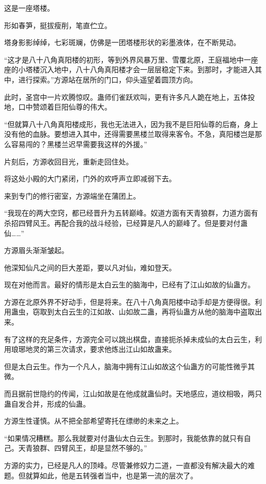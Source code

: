 
\begin{this_body}

这是一座塔楼。

形如春笋，挺拔瘦削，笔直伫立。

塔身影影绰绰，七彩斑斓，仿佛是一团塔楼形状的彩墨液体，在不断晃动。

“这才是八十八角真阳楼的初形，等到外界风暴万里、雪覆北原，王庭福地中一座座的小塔楼沉入地中，八十八角真阳楼才会一层层稳定下来。到那时，才能进入其中，进行探索。”方源站在居所的门口，仰头遥望着圆顶方向。

此时，圣宫中一片欢腾惊叹。蛊师们雀跃欢叫，更有许多凡人跪在地上，五体投地，口中赞颂着巨阳仙尊的伟大。

“但就算八十八角真阳楼成形，我也无法进入，因为我不是巨阳仙尊的后裔，身上没有他的血脉。要想进入其中，还得需要黑楼兰取得来客令。不急，真阳楼岂是那么容易闯的？黑楼兰迟早需要我这样的外援。”

片刻后，方源收回目光，重新走回住处。

将这处小殿的大门紧闭，门外的欢呼声立即减弱下去。

来到专门的修行密室，方源端坐在蒲团上。

“我现在的两大空窍，都已经晋升为五转巅峰。奴道方面有天青狼群，力道方面有杀招四臂风王。再配合我的战斗经验，已经算是凡人的巅峰了。但是要对付蛊仙……”

方源眉头渐渐皱起。

他深知仙凡之间的巨大差距，要以凡对仙，难如登天。

现在对他而言。最好的情形是太白云生的脑海中，已经有了江山如故的仙蛊方。

方源在北原外界不好动手，但是将来。在八十八角真阳楼中动手却是方便得很。利用蛊虫，窃取到太白云生的江如故、山如故二蛊，再将仙蛊方从他的脑海中盗取出来。

有了这样的充足条件，方源完全可以跳出棋盘，直接扼杀掉未成仙的太白云生，利用琅琊地灵的第三次请求，要求他炼出江山如故蛊来。

但是太白云生。作为一个凡人，脑海中拥有江山如故这个仙蛊方的可能性微乎其微。

而且据前世隐约的传闻，江山如故是在他成就蛊仙时。天地感应，道纹相吸，两只蛊自发合并，形成的仙蛊。

方源生性谨慎。从不把全部希望寄托在缥缈的未来之上。

“如果情况糟糕。那么我就要对付蛊仙太白云生。到那时，我能依靠的就只有自己。天青狼群、四臂风王，却是显然不够的。”

方源的实力，已经是凡人的顶峰。尽管兼修奴力二道，一直都没有解决最大的难题。但就算如此，他是五转强者当中，也是第一流的层次了。


\end{this_body}
